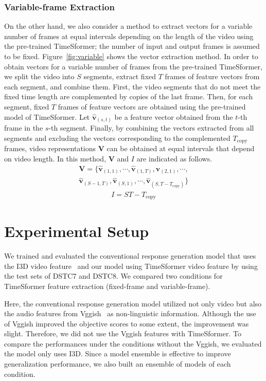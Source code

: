 \documentclass[letterpaper]{article}
\begin{document}
\subsubsection{Variable-frame Extraction}
On the other hand, we also consider a method to extract vectors for a variable number of frames at equal intervals depending on the length of the video using the pre-trained TimeSformer; the number of input and output frames is assumed to be fixed.
Figure~\ref{fig:variable} shows the vector extraction method.
In order to obtain vectors for a variable number of frames from the pre-trained TimeSformer, we split the video into $S$ segments, extract fixed $T$ frames of feature vectors from each segment, and combine them.
First, the video segments that do not meet the fixed time length are complemented by copies of the last frame.
Then, for each segment, fixed $T$ frames of feature vectors are obtained using the pre-trained model of TimeSformer.
Let $\bm{\hat{v}}_{(s,t)}$ be a feature vector obtained from the $t$-th frame in the $s$-th segment.
Finally, by combining the vectors extracted from all segments and excluding the vectors corresponding to the complemented $T_{\textrm{copy}}$ frames, video representations $\bm{V}$ can be obtained at equal intervals that depend on video length.
In this method, $\bm{V}$ and $I$ are indicated as follows.
\begin{multline}
    \bm{V} = \{\bm{\hat{v}}_{(1,1)}, \cdots , \bm{\hat{v}}_{(1,T)}, \bm{\hat{v}}_{(2,1)}, \cdots ,\\ \bm{\hat{v}}_{(S-1,T)}, \bm{\hat{v}}_{(S,1)}, \cdots , \bm{\hat{v}}_{(S,T-T_{\textrm{copy}})}\}
\end{multline}
\begin{gather}
    I = ST - T_{\textrm{copy}}
\end{gather}


\section{Experimental Setup}
We trained and evaluated the conventional response generation model that uses the I3D video feature~\cite{Li2021bridging} and our model using TimeSformer video feature by using the test sets of DSTC7 and DSTC8.
We compared two conditions for TimeSformer feature extraction (fixed-frame and variable-frame).

Here, the conventional response generation model utilized not only video but also the audio features from Vggish~\cite{Hershey2017cnn} as non-linguistic information.
Although the use of Vggish improved the objective scores to some extent, the improvement was slight.
Therefore, we did not use the Vggish features with TimeSformer.
To compare the performances under the conditions without the Vggish, we evaluated the model only uses I3D.
Since a model ensemble is effective to improve generalization performance, we also built an ensemble of models of each condition.
\end{document}
